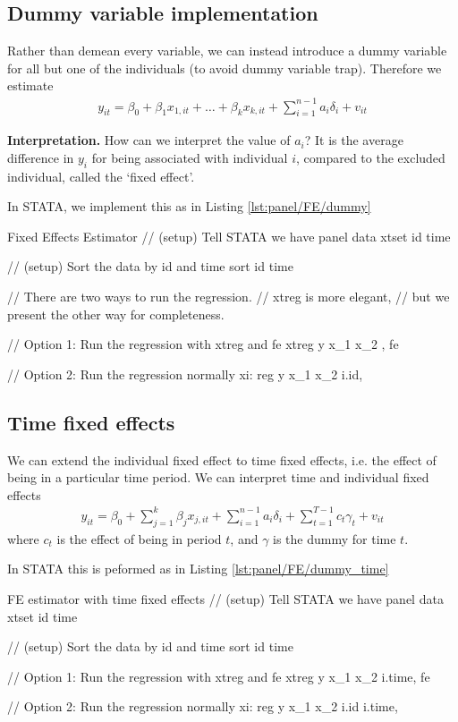 			\subsection{Dummy variable implementation}
				Rather than demean every variable, we can instead introduce a dummy variable for all but one of the individuals (to avoid dummy variable trap). Therefore we estimate
				\begin{align}
					\textstyle y_{it} = \beta_0 +\beta_1 x_{1,it}+\dots +\beta_k x_{k,it} +\sum_{i=1}^{n-1}a_i\delta_i +v_{it}
				\end{align}
				
				\noindent\textbf{Interpretation.} How can we interpret the value of $a_i$? It is the average difference in $y_i$ for being associated with individual $i$, compared to the excluded individual, called the `fixed effect'.
				
				In STATA, we implement this as in Listing \ref{lst:panel/FE/dummy}
				\begin{sexylisting}[colback=white, label=lst:panel/FE/dummy]{Fixed Effects Estimator}
//	(setup) Tell STATA we have panel data
	xtset id time

//	(setup) Sort the data by id and time
	sort id time

//	There are two ways to run the regression.
//	xtreg is more elegant, 
//	but we present the other way for completeness.

//	Option 1: Run the regression with xtreg and fe
	xtreg y x_1 x_2 , fe

//	Option 2: Run the regression normally
	xi: reg y x_1 x_2  i.id,
				\end{sexylisting}
				
			\subsection{Time fixed effects}
				We can extend the individual fixed effect to time fixed effects, i.e. the effect of being in a particular time period. We can interpret time and individual fixed effects
				\begin{align}
					\textstyle y_{it} = \beta_0 + \sum_{j=1}^k \beta_j x_{j,it}+\sum_{i=1}^{n-1}a_i\delta_i +\sum_{t=1}^{T-1}c_t\gamma_t+v_{it}
				\end{align}
				where $c_t$ is the effect of being in period $t$, and $\gamma$ is the dummy for time $t$.
				
				In STATA this is peformed as in Listing \ref{lst:panel/FE/dummy_time}
				\begin{sexylisting}[colback=white, label=lst:panel/FE/dummy_time]{FE estimator with time fixed effects}
//	(setup) Tell STATA we have panel data 
	xtset id time

//	(setup) Sort the data by id and time
	sort id time

//	Option 1: Run the regression with xtreg and fe
	xtreg y x_1 x_2 i.time, fe

//	Option 2: Run the regression normally
	xi: reg y x_1 x_2 i.id i.time,
				\end{sexylisting}
				
